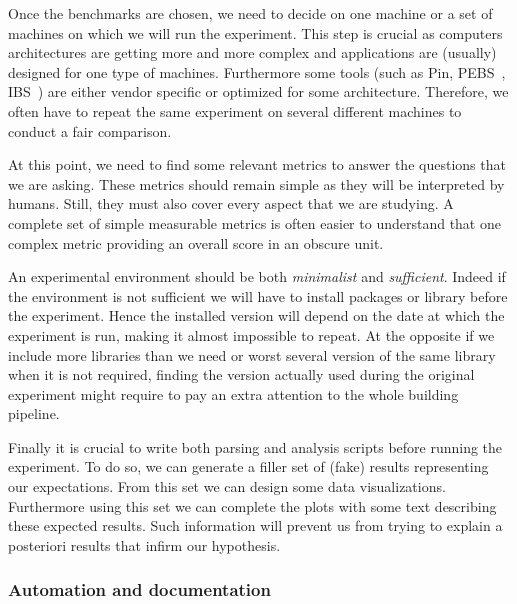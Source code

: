 Once the benchmarks are chosen, we need to decide on one machine or a set of machines on which we will run the experiment.
This step is crucial as computers architectures are getting more and more complex  and applications are (usually) designed for one type of machines.
Furthermore some tools (such as \gls{Pin}, \gls{PEBS}~\cite{Levinthal09Performance}, \gls{IBS}~\cite{Drongowski07Instructionbased}) are either vendor specific or optimized for some architecture.
Therefore, we often have to repeat the same experiment on several different machines to conduct a fair comparison.

At this point, we need to find some relevant metrics to answer the questions that we are asking.
These metrics should remain simple as they will be interpreted by humans.
Still, they must also cover every aspect that we are studying.
A complete set of simple measurable metrics is often easier to understand that one complex metric providing an overall score in an obscure unit.

An experimental environment should be both \emph{minimalist} and \emph{sufficient}.
Indeed if the environment is not sufficient we will have to install packages or library before the experiment.
Hence the installed version will depend on the date at which the experiment is run, making it almost impossible to repeat.
At the opposite if we include more libraries than we need or worst several version of the same library when it is not required, finding the version actually used during the original experiment might require to pay an extra attention to the whole building pipeline.

Finally it is crucial to write both parsing and analysis scripts before running the experiment.
To do so, we can generate a filler set of (fake) results representing our expectations.
From this set we can design some data visualizations.
Furthermore using this set we can complete the plots with some text describing these expected results.
Such information will prevent us from trying to explain a posteriori results that infirm our hypothesis.

\subsubsection{Automation and documentation}

